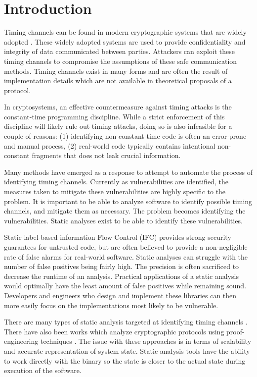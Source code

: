 \section{Introduction}

Timing channels can be found in modern cryptographic systems that are widely
adopted \cite{kochertiming,brumley2005remote,percival2005cache,bernstein2017sliding}.
These widely adopted systems are used to provide confidentiality and integrity
of data communicated between parties. Attackers can exploit these timing
channels to compromise the assumptions of these safe communication methods.
Timing channels exist in many forms and are often the result of implementation
details which are not available in theoretical proposals of a protocol.

In cryptosystems, an effective countermeasure against timing attacks is the
constant-time programming discipline.  While a strict enforcement of this
discipline will likely rule out timing attacks, doing so is also infeasible for
a couple of reasons: (1) identifying non-constant time code  is often an
error-prone and manual process, (2) real-world code typically contains
intentional non-constant fragments that does not leak crucial information.

Many methods have emerged as a response to attempt to automate the process of
identifying timing channels. Currently as vulnerabilities are
identified, the measures taken to mitigate these vulnerabilities are highly
specific to the problem. It is important to be able to analyze software to
identify possible timing channels, and mitigate them as necessary. The problem
becomes identifying the vulnerabilities. Static analyses exist to be able to
identify these vulnerabilities.

Static label-based information Flow Control (IFC) provides strong security
guarantees for untrusted code, but are often believed to provide a
non-negligible rate of false alarms for real-world software.
  Static analyses can struggle with the number of false positives being fairly
  high. The precision is often sacrificed to decrease the runtime of an
  analysis. Practical applications of a static analysis would optimally have the
  least amount of false positives while remaining sound. Developers and
  engineers who design and implement these libraries can then more easily focus
  on the implementations most likely to be vulnerable.
  
  There are many types of static analysis targeted at identifying timing
  channels \cite{cached-zhang, brotzmancasym, molnar2005program}. There have also been
  works which analyze cryptographic protocols using proof-engineering techniques
  \cite{proof-engineering}. The issue with these approaches is in terms of
  scalability and accurate representation of system state. Static analysis tools
  have the ability to work directly with the binary so the state is closer to
  the actual state during execution of the software.

